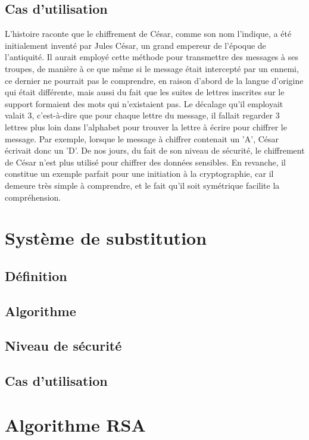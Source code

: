 		\subsection{Cas d'utilisation}
			L'histoire raconte que le chiffrement de César, comme son nom l'indique, a été initialement inventé par Jules César, un grand empereur de l'époque de l'antiquité. Il aurait employé cette méthode pour transmettre des messages à ses troupes, de manière à ce que même si le message était intercepté par un ennemi, ce dernier ne pourrait pas le comprendre, en raison d'abord de la langue d'origine qui était différente, mais aussi du fait que les suites de lettres inscrites sur le support formaient des mots qui n'existaient pas. Le décalage qu'il employait valait 3, c'est-à-dire que pour chaque lettre du message, il fallait regarder 3 lettres plus loin dans l'alphabet pour trouver la lettre à écrire pour chiffrer le message. Par exemple, lorsque le message à chiffrer contenait un 'A', César écrivait donc un 'D'.
			De nos jours, du fait de son niveau de sécurité, le chiffrement de César n'est plus utilisé pour chiffrer des données sensibles. En revanche, il constitue un exemple parfait pour une initiation à la cryptographie, car il demeure très simple à comprendre, et le fait qu'il soit symétrique facilite la compréhension.
	\section{Système de substitution}
		\subsection{Définition}
		\subsection{Algorithme}
		\subsection{Niveau de sécurité}
		\subsection{Cas d'utilisation}
	\section{Algorithme RSA}